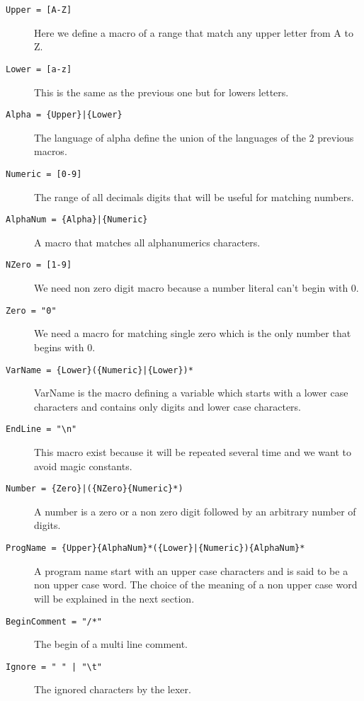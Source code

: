\documentclass[12pt]{article}
\begin{document}
\begin{description}
    
    
    \item[\texttt{Upper = [A-Z]}]
    Here we define a macro of a range that match any upper letter from A to Z.
    
    \item[\texttt{Lower = [a-z]}]
    This is the same as the previous one but for lowers letters.
    
    \item[\texttt{Alpha          = \{Upper\}|\{Lower\}}]
    The language of alpha define the union of the languages of the 2 previous macros.
    
    \item[\texttt{Numeric        = [0-9]}]
    The range of all decimals digits that will be useful for matching numbers.
    
    \item[\texttt{AlphaNum	 = \{Alpha\}|\{Numeric\}}]
    A macro that matches all alphanumerics characters.
    
    \item[\texttt{NZero          = [1-9]}]
    We need non zero digit macro because a number literal can't begin with 0.
    
    \item[\texttt{Zero           = "0"}]
    We need a macro for matching single zero which is the only number that begins with 0.
    
    \item[\texttt{VarName 	   = \{Lower\}(\{Numeric\}|\{Lower\})*}]
    VarName is the macro defining a variable which starts with a lower case characters and contains only digits and 
    lower case characters.
    
    \item[\texttt{EndLine        = "\textbackslash n"}]
    This macro exist because it will be repeated several time and we want to avoid magic constants.
    
    \item[\texttt{Number         = \{Zero\}|(\{NZero\}\{Numeric\}*)}]
    A number is a zero or a non zero digit followed by an arbitrary number of digits.
    
    \item[\texttt{ProgName =  \{Upper\}\{AlphaNum\}*(\{Lower\}|\{Numeric\})\{AlphaNum\}*}]
    A program name start with an upper case characters and is said to be a non upper case word. 
    The choice of the meaning of a non upper case word will be explained in the next section.
    
    \item[\texttt{BeginComment   = "/*"}] The begin of a multi line comment.

    \item[\texttt{Ignore 		   = " " | "\textbackslash t"}] The ignored characters by the lexer. 

\end{description}
\end{document}
